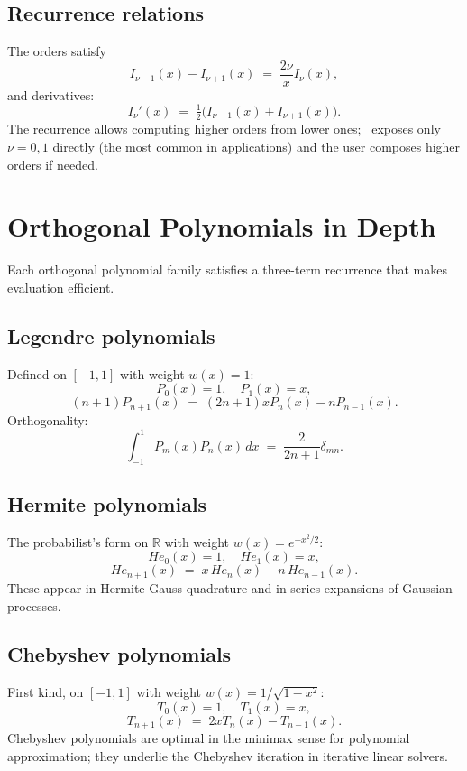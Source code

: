 \subsection{Recurrence relations}
\label{ssec:special_functions:bessel_recurrence}

The orders satisfy
\[
I_{\nu - 1}(x) - I_{\nu + 1}(x) \;=\; \frac{2\nu}{x} I_\nu(x),
\]
and derivatives:
\[
I_\nu'(x) \;=\; \tfrac{1}{2}\bigl(I_{\nu - 1}(x) + I_{\nu + 1}(x)\bigr).
\]
The recurrence allows computing higher orders from lower ones;
\Lucid\ exposes only $\nu = 0, 1$ directly (the most common in
applications) and the user composes higher orders if needed.

\section{Orthogonal Polynomials in Depth}
\label{sec:special_functions:orthogonal_depth}

Each orthogonal polynomial family satisfies a three-term
recurrence that makes evaluation efficient.

\subsection{Legendre polynomials}
\label{ssec:special_functions:legendre_detail}

Defined on $[-1, 1]$ with weight $w(x) = 1$:
\[
P_0(x) = 1,\quad P_1(x) = x,
\]
\[
(n+1) P_{n+1}(x) \;=\; (2n+1) x P_n(x) - n P_{n-1}(x).
\]
Orthogonality:
\[
\int_{-1}^{1} P_m(x) P_n(x)\, dx \;=\; \frac{2}{2n+1} \delta_{mn}.
\]

\subsection{Hermite polynomials}
\label{ssec:special_functions:hermite_detail}

The probabilist's form on $\mathbb{R}$ with weight $w(x) =
e^{-x^2/2}$:
\[
He_0(x) = 1,\quad He_1(x) = x,
\]
\[
He_{n+1}(x) \;=\; x\, He_n(x) - n\, He_{n-1}(x).
\]
These appear in Hermite-Gauss quadrature and in series
expansions of Gaussian processes.

\subsection{Chebyshev polynomials}
\label{ssec:special_functions:chebyshev_detail}

First kind, on $[-1, 1]$ with weight $w(x) = 1/\sqrt{1 - x^2}$:
\[
T_0(x) = 1,\quad T_1(x) = x,
\]
\[
T_{n+1}(x) \;=\; 2 x T_n(x) - T_{n-1}(x).
\]
Chebyshev polynomials are optimal in the minimax sense for
polynomial approximation; they underlie the Chebyshev iteration
in iterative linear solvers.

